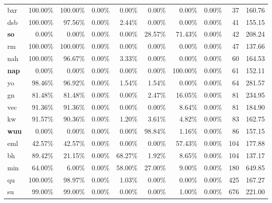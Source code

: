 \begin{table}[hbt!]
{\begin{tabular}{l|rrrr|rrr|rr}
            bxr          & 100.00\% & 100.00\% & 0.00\% & 0.00\%  & 0.00\%   & 0.00\%   & 0.00\% & 37           & 160.76     \\
            dsb          & 100.00\% & 97.56\%  & 0.00\% & 2.44\%  & 0.00\%   & 0.00\%   & 0.00\% & 41           & 155.15     \\
            \textbf{so}  & 0.00\%   & 0.00\%   & 0.00\% & 0.00\%  & 28.57\%  & 71.43\%  & 0.00\% & 42           & 208.24     \\
            rm           & 100.00\% & 100.00\% & 0.00\% & 0.00\%  & 0.00\%   & 0.00\%   & 0.00\% & 47           & 137.66     \\
            nah          & 100.00\% & 96.67\%  & 0.00\% & 3.33\%  & 0.00\%   & 0.00\%   & 0.00\% & 60           & 164.53     \\
            \textbf{nap} & 0.00\%   & 0.00\%   & 0.00\% & 0.00\%  & 0.00\%   & 100.00\% & 0.00\% & 61           & 152.11     \\
            yo           & 98.46\%  & 96.92\%  & 0.00\% & 1.54\%  & 1.54\%   & 0.00\%   & 0.00\% & 64           & 281.57     \\
            gn           & 81.48\%  & 81.48\%  & 0.00\% & 0.00\%  & 2.47\%   & 16.05\%  & 0.00\% & 81           & 234.95     \\
            vec          & 91.36\%  & 91.36\%  & 0.00\% & 0.00\%  & 0.00\%   & 8.64\%   & 0.00\% & 81           & 184.90     \\
            kw           & 91.57\%  & 90.36\%  & 0.00\% & 1.20\%  & 3.61\%   & 4.82\%   & 0.00\% & 83           & 162.75     \\
            \textbf{wuu} & 0.00\%   & 0.00\%   & 0.00\% & 0.00\%  & 98.84\%  & 1.16\%   & 0.00\% & 86           & 157.15     \\
            eml          & 42.57\%  & 42.57\%  & 0.00\% & 0.00\%  & 0.00\%   & 57.43\%  & 0.00\% & 104          & 177.88     \\
            bh           & 89.42\%  & 21.15\%  & 0.00\% & 68.27\% & 1.92\%   & 8.65\%   & 0.00\% & 104          & 137.17     \\
            min          & 64.00\%  & 6.00\%   & 0.00\% & 58.00\% & 27.00\%  & 9.00\%   & 0.00\% & 180          & 649.85     \\
            qu           & 100.00\% & 98.97\%  & 0.00\% & 1.03\%  & 0.00\%   & 0.00\%   & 0.00\% & 425          & 167.27     \\
            su           & 99.00\%  & 99.00\%  & 0.00\% & 0.00\%  & 0.00\%   & 1.00\%   & 0.00\% & 676          & 221.00     \\

\end{tabular}}
\end{table}
